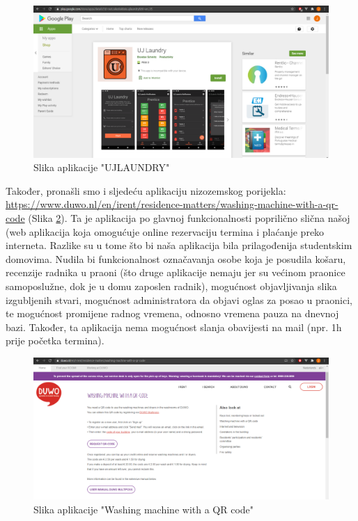 			\begin{figure}[H]
				\includegraphics[width=.9\linewidth]{slike/UJLAUNDRY.PNG}
				\centering
				\caption{Slika aplikacije "UJLAUNDRY"}
				\label{fig:ujlaundry}
			\end{figure}
		
		
			{Također, pronašli smo i sljedeću aplikaciju nizozemskog porijekla: \url{https://www.duwo.nl/en/irent/residence-matters/washing-machine-with-a-qr-code} (Slika  \ref{fig:duwo}). Ta je aplikacija po glavnoj funkcionalnosti 
			poprilično slična našoj (web aplikacija koja omogućuje online rezervaciju termina i plaćanje preko
			interneta. Razlike su u tome što bi naša aplikacija bila prilagođenija studentskim domovima. Nudila bi
			funkcionalnost označavanja osobe koja je posudila košaru, recenzije radnika u praoni (što druge
			aplikacije nemaju jer su većinom praonice samoposlužne, dok je u domu zaposlen radnik), mogućnost
			objavljivanja slika izgubljenih stvari, mogućnost administratora da objavi oglas za posao u praonici, te
			mogućnost promijene radnog vremena, odnosno vremena pauza na dnevnoj bazi. Također, ta aplikacija
			nema mogućnost slanja obavijesti na mail (npr. 1h prije početka termina).}
		
			\begin{figure}[H]
				\includegraphics[width=.9\linewidth]{slike/DUWO.PNG}
				\centering
				\caption{Slika aplikacije "Washing machine with a QR code"}
				\label{fig:duwo}
			\end{figure}
		
